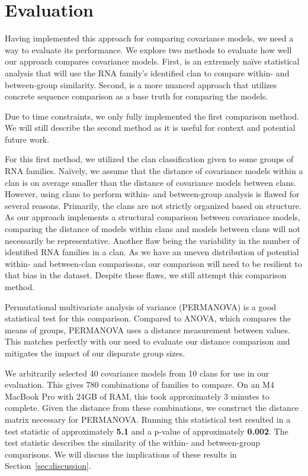 \section{Evaluation}
\label{sec:evaluation}

Having implemented this approach for comparing covariance models, we need a way to evaluate its performance.
We explore two methods to evaluate how well our approach compares covariance models.
First, is an extremely naïve statistical analysis that will use the RNA family's identified clan to compare within- and between-group similarity.
Second, is a more nuanced approach that utilizes concrete sequence comparison as a base truth for comparing the models.

Due to time constraints, we only fully implemented the first comparison method.
We will still describe the second method as it is useful for context and potential future work.

For this first method, we utilized the clan classification given to some groups of RNA families. Naïvely, we assume that the distance of covariance models within a clan is on average smaller than the distance of covariance models between clans. However, using clans to perform within- and between-group analysis is flawed for several reasons.
Primarily, the clans are not strictly organized based on structure.
As our approach implements a structural comparison between covariance models, comparing the distance of models within clans and models between clans will not necessarily be representative.
Another flaw being the variability in the number of identified RNA families in a clan.
As we have an uneven distribution of potential within- and between-clan comparisons, our comparison will need to be resilient to that bias in the dataset.
Despite these flaws, we still attempt this comparison method.

Permutational multivariate analysis of variance (PERMANOVA) is a good statistical test for this comparison. Compared to ANOVA, which compares the means of groups, PERMANOVA uses a distance measurement between values.
This matches perfectly with our need to evaluate our distance comparison and mitigates the impact of our disparate group sizes.

We arbitrarily selected 40 covariance models from 10 clans for use in our evaluation.
This gives 780 combinations of families to compare.
On an M4 MacBook Pro with 24GB of RAM, this took approximately 3 minutes to complete.
Given the distance from these combinations, we construct the distance matrix necessary for PERMANOVA.
Running this statistical test resulted in a test statistic of approximately \textbf{5.1} and a p-value of approximately \textbf{0.002}.
The test statistic describes the similarity of the within- and between-group comparisons.
We will discuss the implications of these results in Section~\ref{sec:discussion}.

